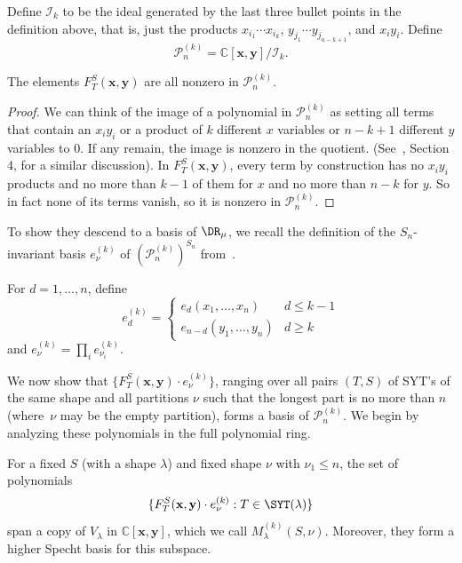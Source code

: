 \begin{definition}
	Define $\mathcal{I}_k$ to be the ideal generated by  the last three bullet points in the definition above, that is, just the products $x_{i_1}\cdots x_{i_k}$, $y_{j_1}\cdots y_{j_{n-k+1}}$, and $x_iy_i$.  Define $$\mathcal{P}_{n}^{(k)}=\mathbb{C}[\mathbf{x},\mathbf{y}]/\mathcal{I}_k.$$
\end{definition}

\begin{lemma}
	The elements $F_T^S(\mathbf{x},\mathbf{y})$ are all nonzero in $\mathcal{P}_n^{(k)}$.
\end{lemma}

\begin{proof}
	We can think of the image of a polynomial in $\mathcal{P}_n^{(k)}$ as setting all terms that contain an $x_iy_i$ or a product of $k$ different $x$ variables or $n-k+1$ different $y$ variables to $0$.  If any remain, the image is nonzero in the quotient. (See~\cite{HookBases}, Section 4, for a similar discussion).  In $F_T^S(\mathbf{x},\mathbf{y})$, every term by construction has no $x_iy_i$ products and no more than $k-1$ of them for $x$ and no more than $n-k$ for $y$.  So in fact none of its terms vanish, so it is nonzero in $\mathcal{P}_n^{(k)}$.
\end{proof}

To show they descend to a basis of $\DR_\mu$, we recall the definition of the $S_n$-invariant basis $e_\nu^{(k)}$ of $(\mathcal{P}_n^{(k)})^{S_n}$ from~\cite{HookBases}.

\begin{definition}
	For $d=1,\ldots,n$, define $$e_d^{(k)}=\begin{cases}
	e_d(x_1,\ldots,x_n) & d\le k-1 \\
	e_{n-d}(y_1,\ldots,y_n) & d\ge k
	\end{cases}$$ and $e_\nu^{(k)}=\prod_i e_{\nu_i}^{(k)}$.
\end{definition}

We now show that $\{F_T^S(\mathbf{x},\mathbf{y})\cdot e_\nu^{(k)}\}$, ranging over all pairs $(T,S)$ of SYT's of the same shape and all partitions $\nu$ such that the longest part is no more than $n$ (where~$\nu$ may be the empty partition), forms a basis of $\mathcal{P}_n^{(k)}$.  We begin by analyzing these polynomials in the full polynomial ring.

\begin{lemma}\label{lem:MS}
	For a fixed $S$ (with a shape $\lambda$) and fixed shape $\nu$ with $\nu_1\le n$, the set of polynomials $$\{F_T^S(\mathbf{x},\mathbf{y})\cdot e_\nu^{(k)}:T\in \SYT(\lambda)\}$$ span a copy of $V_\lambda$ in $\mathbb{C}[\mathbf{x},\mathbf{y}]$, which we call $M^{(k)}_{\lambda}(S,\nu)$.  Moreover, they form a higher Specht basis for this subspace.
\end{lemma}

